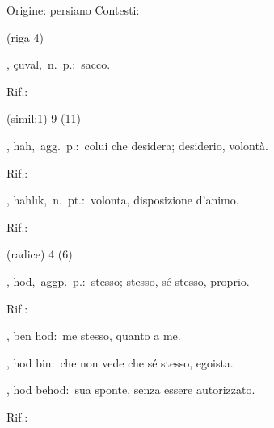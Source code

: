 \begin{glossario}{Origine: persiano}
Contesti:
\begin{subvocedue}
\item[(riga 4)] 
\end{subvocedue}
\item[{\color{colorlowref}\spzrl{^cu:vAl}},] {\sf çuval},\ n.\ p.:\ sacco.
\begin{subvocedue}
\item[Rif.:] 
\end{subvocedue}
\begin{subvocedue}
\item[(simil:1)]   9 (11)
\end{subvocedue}
\item[{\color{colorlowref}\spzrl{_h_wAh}},] {\sf hah},\ agg.\ p.:\ colui che desidera; desiderio, volontà.
\begin{subvocedue}
\item[Rif.:] 
\end{subvocedue}
\begin{subvocedue}
\item[\subglossariobullet] , {\sf hahlık},\ n.\ pt.:\ volonta, disposizione d'animo.
\begin{subvocedue}
\item[Rif.:] 
\end{subvocedue}
\item[(radice)]   4 (6)
\end{subvocedue}
\item[{\color{colorsologlossario}{\bf (g)}}] {\color{colorsologlossario}}, {\sf hod},\ aggp.\ p.:\ stesso; stesso, sé stesso, proprio.
\begin{subvocedue}
\item[Rif.:] 
\end{subvocedue}
\begin{subvocedue}
\item[\subglossariobullet] , {\sf ben hod}:\ me stesso, quanto a me.
\item[\subglossariobullet] , {\sf hod bin}:\ che non vede che sé stesso, egoista.
\item[\subglossariobullet] , {\sf hod behod}:\ sua sponte, senza essere autorizzato.
\begin{subvocedue}
\item[Rif.:] 

\end{subvocedue}
\end{subvocedue}
\end{glossario}
